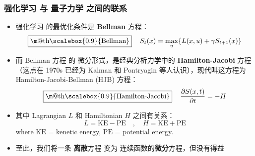 \documentclass[15pt]{beamer}
\makeatletter
\newcommand{\cc}[2]{#1}
\newcommand{\cc}[2]{#2}
\newcommand{\emp}[1]{{\color{violet}#1}}
\newcommand{\red}[1]{{\color{red}#1}}
\renewcommand{\boxed}[1]{\fbox{\m@th$\displaystyle\scalebox{0.9}{#1}$} \,}
\makeatother
\begin{document}
\begin{frame}
\frametitle{\cc{强化学习 与 量子力学 之间的联系}{Connection between reinforcement learning \& quantum mechanics}}

\begin{itemize}
	\item \cc{
	强化学习 的最优化条件是 \textbf{Bellman} 方程：}{
	The optimal condition for reinforcement learning is the \emp{Bellman} equation:
	}
		\begin{equation}
			\boxed{\mbox{Bellman}} \quad S_t(x) = \max_u \{ L(x,u) + \gamma S_{t+1}(x) \}
		\end{equation}
		
	\item \cc{
	而 Bellman 方程 的 微分形式，是经典分析力学中的 \textbf{Hamilton-Jacobi} 方程 （这点在 1970s 已经为 Kalman 和 Pontryagin 等人认识），现代叫这方程为 Hamilton-Jacobi-Bellman (HJB) 方程：}{
	The differential version of Bellman equation is the \emp{Hamilton-Jacobi} equation in classical analytic mechanics (This has been recognized in 1970's by Kalman, Pontryagin and others):
	}
		\begin{equation}
			\boxed{\mbox{Hamilton-Jacobi}} \quad \frac{\partial S(x, t)}{\partial t} = -H
		\end{equation}
		
	\item \cc{
	其中 Lagrangian $L$ 和 Hamiltonian $H$ 之间有关系：}{
	The Hamiltionian $H$ arises when trying to maximize the Lagrangian $L$ using Lagrangian multipliers.  Such multipliers have the interpretation of \emp{momentum}.
	}
	\begin{equation}
		L = \text{KE} - \text{PE} \quad , \quad H = \text{KE} + \text{PE}
	\end{equation}
	where $\text{KE}$ = kenetic energy, $\text{PE}$ = potential energy.

	\item \cc{
	至此，我们将一条 \textbf{离散}方程 变为 连续函数的\textbf{微分}方程，但\red{没有得益}}{
	Up to now, we changed a \emp{discrete} equation to a continuous \emp{differential} equation, but that has not yielded any advantage
	}
	
\end{itemize}
\end{frame}
\end{document}
